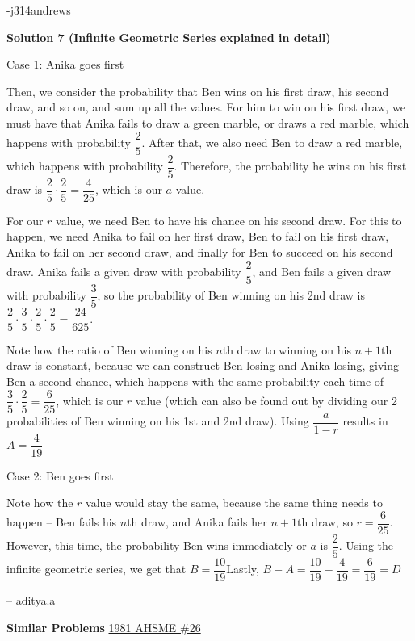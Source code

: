 \begin{enumerate}
 -j314andrews

 



\textbf{Solution 7 (Infinite Geometric Series explained in detail)}

Case 1: Anika goes first 

 Then, we consider the probability that Ben wins on his first draw, his second draw, and so on, and sum up all the values. For him to win on his first draw, we must have that Anika fails to draw a green marble, or draws a red marble, which happens with probability $\dfrac{2}{5}$. After that, we also need Ben to draw a red marble, which happens with probability $\dfrac{2}{5}$. Therefore, the probability he wins on his first draw is $\dfrac{2}{5} \cdot \dfrac{2}{5} = \dfrac{4}{25}$, which is our $a$ value.  

 
For our $r$ value, we need Ben to have his chance on his second draw. For this to happen, we need Anika to fail on her first draw, Ben to fail on his first draw, Anika to fail on her second draw, and finally for Ben to succeed on his second draw. Anika fails a given draw with probability $\dfrac{2}{5}$, and Ben fails a given draw with probability $\dfrac{3}{5}$, so the probability of Ben winning on his 2nd draw is $\dfrac{2}{5} \cdot \dfrac{3}{5} \cdot \dfrac{2}{5} \cdot \dfrac{2}{5} = \dfrac{24}{625}$. 

 
Note how the ratio of Ben winning on his $n$th draw to winning on his $n + 1$th draw is constant, because we can construct Ben losing and Anika losing, giving Ben a second chance, which happens with the same probability each time of $\dfrac{3}{5} \cdot \dfrac{2}{5} = \dfrac{6}{25}$, which is our $r$ value (which can also be found out by dividing our 2 probabilities of Ben winning on his 1st and 2nd draw). Using $\dfrac{a}{1 - r}$ results in $A = \dfrac{4}{19}$

 
Case 2: Ben goes first

 Note how the $r$ value would stay the same, because the same thing needs to happen -- Ben fails his $n$th draw, and Anika fails her $n + 1$th draw, so $r = \dfrac{6}{25}$. However, this time, the probability Ben wins immediately or $a$ is $\dfrac{2}{5}$. Using the infinite geometric series, we get that $B = \dfrac{10}{19}$Lastly, $B - A = \dfrac{10}{19} - \dfrac{4}{19} = \boxed{\dfrac{6}{19}} = \boxed{D}$ 

 -- aditya.a

 \textbf{Similar Problems} \href{https://artofproblemsolving.com/wiki/index.php?title=1981\_AHSME\_Problems/Problem\_26}{1981 AHSME \#26}


\end{enumerate}
